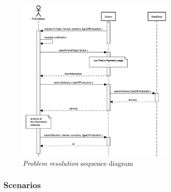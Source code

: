 \begin{enumerate}
\begin{figure}[H]
\begin{center}
        \includegraphics[width=0.7\textwidth]{sequence/replyHelp.png}
        \caption{\emph{Problem resolution} sequence diagram}
        \label{fig:state9}
        \end{center}
    \end{figure}
\end{enumerate}

\subsubsection{Scenarios}
